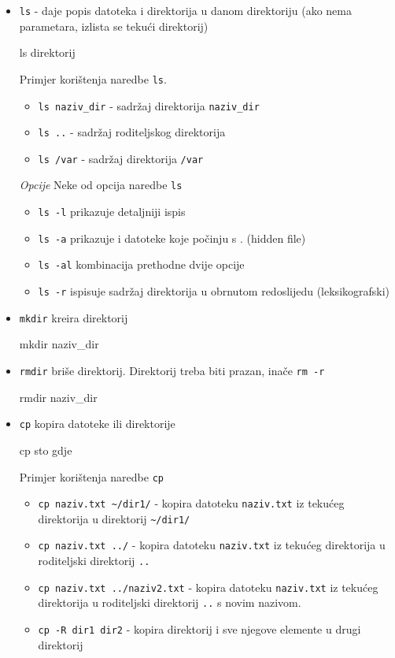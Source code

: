 \begin{itemize}
\item \texttt{ls} - daje popis datoteka i direktorija u danom direktoriju (ako nema parametara, izlista se tekući direktorij)
\begin{prototip}
ls direktorij
\end{prototip}
\begin{primjer} Primjer korištenja naredbe \texttt{ls}.
\begin{itemize}
 \item \texttt{ls naziv\_dir} - sadržaj direktorija \texttt{naziv\_dir}
\item \texttt{ls ..} - sadržaj roditeljskog direktorija
\item \texttt{ls /var} - sadržaj direktorija \texttt{/var}
\end{itemize}
 \textit{Opcije}
\newline Neke od opcija naredbe \texttt{ls}
\begin{itemize}
\item \texttt{ls -l} prikazuje detaljniji ispis
\item \texttt{ls -a} prikazuje i datoteke koje počinju s . (hidden file)
\item \texttt{ls -al} kombinacija prethodne dvije opcije
\item \texttt{ls -r} ispisuje sadržaj direktorija u obrnutom redoslijedu (leksikografski)
\end{itemize}
\end{primjer}

\item \texttt{mkdir} kreira direktorij
\begin{prototip}
mkdir naziv_dir 
\end{prototip}

\item \texttt{rmdir} briše direktorij. Direktorij treba biti prazan, inače \texttt{rm -r}
\begin{prototip}
rmdir naziv_dir 
\end{prototip}


\item \texttt{cp} kopira datoteke ili direktorije
\begin{prototip}
cp sto gdje 
\end{prototip}

\begin{primjer} Primjer korištenja naredbe \texttt{cp}
\begin{itemize}
 \item \lstinline!cp naziv.txt ~/dir1/! - kopira datoteku \texttt{naziv.txt} iz tekućeg direktorija u direktorij \lstinline!~/dir1/!
\item \lstinline!cp naziv.txt ../! - kopira datoteku \texttt{naziv.txt} iz tekućeg direktorija u roditeljski direktorij \texttt{..}
\item \lstinline!cp naziv.txt ../naziv2.txt! - kopira datoteku \texttt{naziv.txt} iz tekućeg direktorija u roditeljski direktorij \texttt{..} s novim nazivom.
 \item \lstinline!cp -R dir1 dir2! - kopira direktorij i sve njegove elemente u drugi direktorij 
\end{itemize}
\end{primjer}


\end{itemize}
